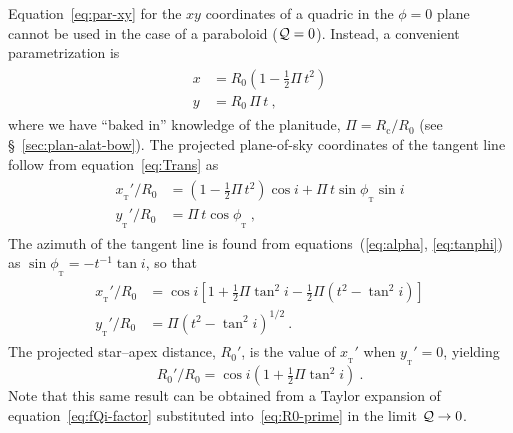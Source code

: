 \documentclass[useAMS, usenatbib, a4paper]{mnras}
\newcommand\C{\ensuremath{\mathrm{c}}}
\newcommand\T{_{\mathrm{\scriptscriptstyle T}}} %
\begin{document}
Equation~\eqref{eq:par-xy} for the \(xy\) coordinates of a quadric in the \(\phi = 0\) plane cannot be used in the case of a paraboloid (\(\mathcal{Q} = 0\)).  Instead, a convenient parametrization is
\begin{gather}
  \label{eq:parabola-xy}
  \begin{aligned}
    x &= R_0 \left(1  - \tfrac{1}{2} \Pi\, t^2\right) \\
    y &= R_0\, \Pi\, t \ ,
  \end{aligned}
\end{gather}
where we have ``baked in'' knowledge of the planitude,
\(\Pi = R_{\C}/R_0\) (see \S~\ref{sec:plan-alat-bow}). The projected
plane-of-sky coordinates of the tangent line follow from
equation~\eqref{eq:Trans} as
\begin{gather}
  \label{eq:parabola-xy-prime-phi}
  \begin{aligned}
    x_{\T}' / R_0 &= \left(1 - \tfrac{1}{2} \Pi\, t^2\right) \cos i
      + \Pi\, t \sin\phi_{\T} \sin i\\
    y_{\T}' / R_0 &= \Pi\, t \cos\phi_{\T}\ ,
  \end{aligned}
\end{gather}
The azimuth of the tangent line is found from
equations~(\ref{eq:alpha}, \ref{eq:tanphi}) as
\(\sin\phi_{\T} = -t^{-1} \tan i \), so that
\begin{gather}
  \label{eq:parabola-xy-prime-final}
  \begin{aligned}
    x_{\T}' / R_0 &= \cos i \left[ 1 + \tfrac{1}{2} \Pi \tan^2 i -
      \tfrac{1}{2} \Pi \left( t^2 - \tan^2 i \right) \right]\\
    y_{\T}' / R_0 &= \Pi \left( t^2 - \tan^2 i \right)^{1/2} \ .
  \end{aligned}
\end{gather}
The projected star--apex distance, \(R_0'\), is the value of
\(x_{\T}'\) when \(y_{\T}' = 0\), yielding
\begin{equation}
  \label{eq:parabola-R0-prime}
  R_0' / R_0 = \cos i \left( 1 + \tfrac{1}{2} \Pi \tan^2 i  \right) \ . 
\end{equation}
Note that this same result can be obtained from a Taylor expansion of
equation~\eqref{eq:fQi-factor} substituted into~\eqref{eq:R0-prime} in
the limit \(\mathcal{Q} \to 0\).
\end{document}
